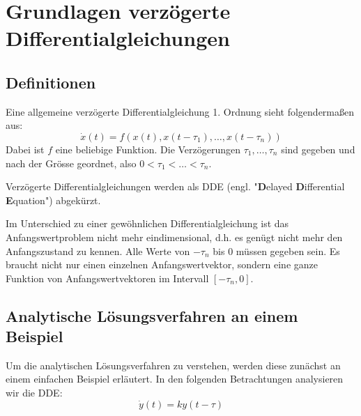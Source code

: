 %
%
%
\section{Grundlagen verzögerte Differentialgleichungen}
\subsection{Definitionen}


\begin{definition}
	Eine allgemeine verzögerte Differentialgleichung 1. Ordnung sieht folgendermaßen aus:
	\begin{equation}
		\dot{x}(t) = f(x(t),x(t-\tau_1),\dots,x(t-\tau_n))
	\end{equation}
	Dabei ist $f$ eine beliebige Funktion. Die Verzögerungen $\tau_1,\dots,\tau_n$ sind gegeben und nach der Grösse geordnet, also $0<\tau_1<\dots<\tau_n$.
\end{definition}
Verzögerte Differentialgleichungen werden als DDE (engl. "\textbf{D}elayed \textbf{D}ifferential \textbf{E}quation") abgekürzt.

Im Unterschied zu einer gewöhnlichen Differentialgleichung ist das Anfangswertproblem nicht mehr eindimensional, d.h. es genügt nicht mehr den Anfangszustand zu kennen.
Alle Werte von $-\tau_n$ bis $0$ müssen gegeben sein. 
Es braucht nicht nur einen einzelnen Anfangswertvektor, sondern eine ganze Funktion von Anfangswertvektoren im Intervall $[-\tau_n, 0]$.

\subsection{Analytische Lösungsverfahren an einem Beispiel}
Um die analytischen Lösungsverfahren zu verstehen, werden diese zunächst an einem einfachen Beispiel erläutert.
In den folgenden Betrachtungen analysieren wir die DDE:
\begin{equation}\label{bsp}
\dot{y}(t)=ky(t-\tau)
\end{equation}

